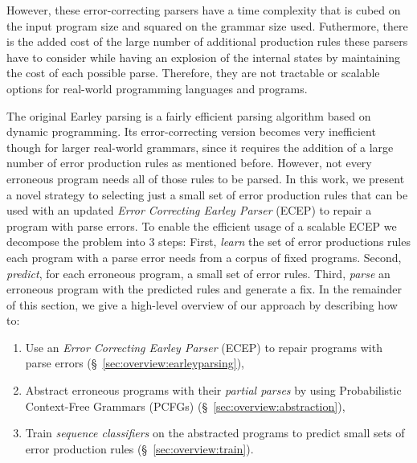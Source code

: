 However, these error-correcting parsers have a time complexity that is cubed on
the input program size and squared on the grammar size used. Futhermore, there
is the added cost of the large number of additional production rules these
parsers have to consider while having an explosion of the internal states by
maintaining the cost of each possible parse. Therefore, they are not tractable
or scalable options for real-world programming languages and programs.


The original Earley parsing is a fairly efficient parsing algorithm
\citep{Earley_1970} based on dynamic programming. Its error-correcting version
becomes very inefficient though for larger real-world grammars, since it
requires the addition of a large number of error production rules as mentioned
before. However, not every erroneous program needs all of those rules to be
parsed. In this work, we present a novel strategy to selecting just a small set
of error production rules that can be used with an updated \emph{Error
Correcting Earley Parser} (ECEP) to repair a program with parse errors.
%
To enable the efficient usage of a scalable ECEP we decompose the problem into 3
steps:
%
First, \emph{learn} the set of error productions rules each program with a parse
error needs from a corpus of fixed programs.
%
Second, \emph{predict}, for each erroneous program, a small set of error rules.
%
Third, \emph{parse} an erroneous program with the predicted rules and generate a
fix.
%
In the remainder of this section, we give a high-level overview
of our approach by describing how to:

\begin{enumerate}

  \item Use an \emph{Error Correcting Earley Parser} (ECEP) to repair programs
  with parse errors (\S~\ref{sec:overview:earleyparsing}),

  \item Abstract erroneous programs with their \emph{partial parses} by using
  Probabilistic Context-Free Grammars (PCFGs)
  (\S~\ref{sec:overview:abstraction}),

  \item Train \emph{sequence classifiers} on the abstracted programs to predict
  small sets of error production rules (\S~\ref{sec:overview:train}).

\end{enumerate}

